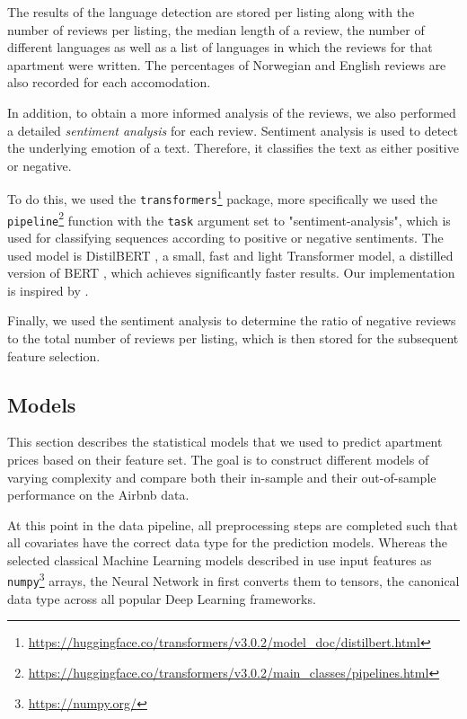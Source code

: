 The results of the language detection are stored per listing along with the number of reviews per listing, the median length of a review, the number of different languages as well as a list of languages in which the reviews for that apartment were written.
The percentages of Norwegian and English reviews are also recorded for each accomodation.

In addition, to obtain a more informed analysis of the reviews, we also performed a detailed \emph{sentiment analysis} for each review.
Sentiment analysis is used to detect the underlying emotion of a text.
Therefore, it classifies the text as either positive or negative.

To do this, we used the \texttt{transformers}\footnote{\url{https://huggingface.co/transformers/v3.0.2/model_doc/distilbert.html}} package, more specifically we used the \texttt{pipeline}\footnote{\url{https://huggingface.co/transformers/v3.0.2/main_classes/pipelines.html}} function with the \texttt{task} argument set to "sentiment-analysis", which is used for classifying sequences according to positive or negative sentiments.
The used model is DistilBERT \citep{sanh2020}, a small, fast and light Transformer model, a distilled version of BERT \citep{devlin2019}, which achieves significantly faster results.
Our implementation is inspired by \citep{selvaraj2020}.

Finally, we used the sentiment analysis to determine the ratio of negative reviews to the total number of reviews per listing, which is then stored for the subsequent feature selection.


\subsection{Models}

This section describes the statistical models that we used to predict apartment prices based on their feature set.
The goal is to construct different models of varying complexity and compare both their in-sample and their out-of-sample performance on the Airbnb data.

At this point in the data pipeline, all preprocessing steps are completed such that all covariates have the correct data type for the prediction models.
Whereas the selected classical Machine Learning models described in  use input features as \texttt{numpy}\footnote{\url{https://numpy.org/}} arrays, the Neural Network in  first converts them to tensors, the canonical data type across all popular Deep Learning frameworks.

